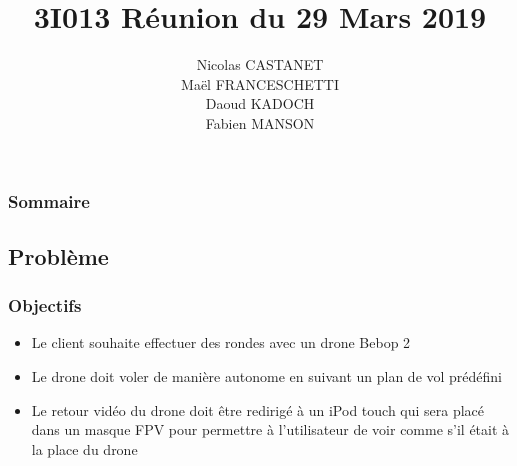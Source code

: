\documentclass{beamer}
\title{3I013 Réunion du 29 Mars 2019}
\author{Nicolas CASTANET\\Maël FRANCESCHETTI\\Daoud KADOCH\\Fabien MANSON\\}
\begin{document}
	\begin{frame}
		\begin{center}
		\date{}
		\maketitle
		\end{center}
	\end{frame}
	
	
	
	\begin{frame}
		\section{}
		\begin{center}
		\frametitle{Sommaire}
		\tableofcontents{}
		\end{center}
	\end{frame}
	
	
	
	\begin{frame}
		\section{Problème}
		\begin{center}
		\frametitle{Objectifs}
		\begin{itemize}
		    \item Le client souhaite effectuer des rondes avec un drone Bebop 2\\
		    \item Le drone doit voler de manière autonome en suivant un plan de vol prédéfini \\
		    \item Le retour vidéo du drone doit être redirigé à un iPod touch qui sera placé dans un masque FPV pour permettre à l'utilisateur de voir comme s'il était à la place du drone\\
		\end{itemize}
		   
		\end{center}
	\end{frame}
	
\end{document}
